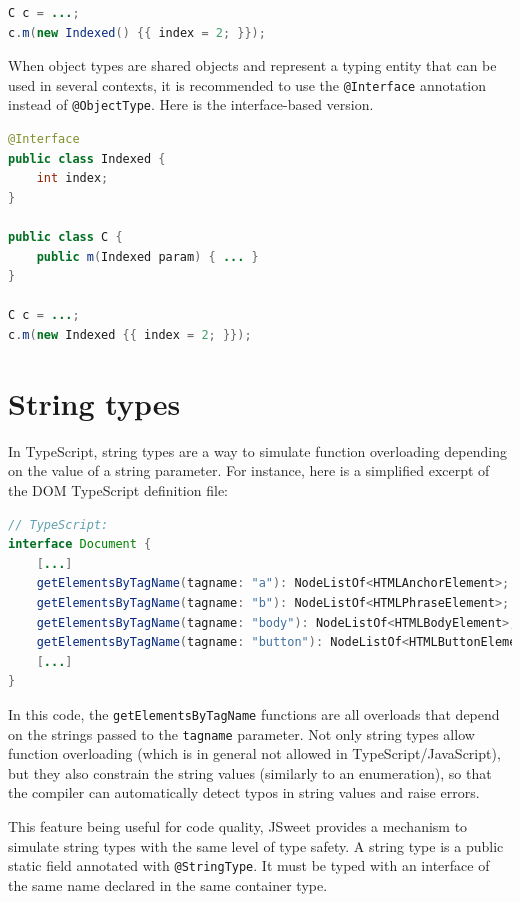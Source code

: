 \documentclass[a4paper]{report}
\begin{document}
\begin{lstlisting}[language=Java]
C c = ...;
c.m(new Indexed() {{ index = 2; }});
\end{lstlisting}

When object types are shared objects and represent a typing entity that can be used in several contexts, it is recommended to use the \texttt{@Interface} annotation instead of \texttt{@ObjectType}. Here is the interface-based version.

\begin{lstlisting}[language=Java]
@Interface
public class Indexed {
	int index;
}

public class C {
	public m(Indexed param) { ... }
}

C c = ...;
c.m(new Indexed {{ index = 2; }});
\end{lstlisting}

\section{String types}

In TypeScript, string types are a way to simulate function overloading depending on the value of a string parameter. For instance, here is a simplified excerpt of the DOM TypeScript definition file:

\begin{lstlisting}[language=Java]
// TypeScript:
interface Document {
	[...]
	getElementsByTagName(tagname: "a"): NodeListOf<HTMLAnchorElement>;
	getElementsByTagName(tagname: "b"): NodeListOf<HTMLPhraseElement>;
	getElementsByTagName(tagname: "body"): NodeListOf<HTMLBodyElement>;
	getElementsByTagName(tagname: "button"): NodeListOf<HTMLButtonElement>;
	[...]
}
\end{lstlisting}

In this code, the \texttt{getElementsByTagName} functions are all overloads that depend on the strings passed to the \texttt{tagname} parameter. Not only string types allow function overloading (which is in general not allowed in TypeScript/JavaScript), but they also constrain the string values (similarly to an enumeration), so that the compiler can automatically detect typos in string values and raise errors. 

This feature being useful for code quality, JSweet provides a mechanism to simulate string types with the same level of type safety. A string type is a public static field annotated with \texttt{@StringType}. It must be typed with an interface of the same name declared in the same container type. 
\end{document}
